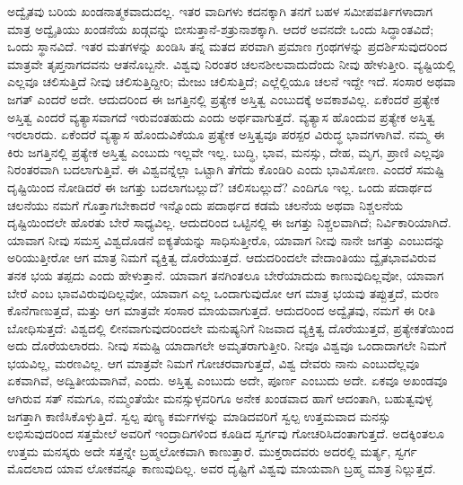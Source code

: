 ಅದ್ವೈತವು ಬರಿಯ ಖಂಡನಾತ್ಮಕವಾದುದಲ್ಲ. ಇತರ ವಾದಿಗಳು ಕದನಕ್ಕಾಗಿ ತನಗೆ ಬಹಳ ಸಮೀಪವರ್ತಿಗಳಾದಾಗ ಮಾತ್ರ ಅದ್ವೈತಿಯು ಖಂಡನೆಯ ಖಡ್ಗವನ್ನು ಬೀಸುತ್ತಾನೆ-ಶತ್ರುನಾಶಕ್ಕಾಗಿ. ಆದರೆ ಅವನದೇ ಒಂದು ಸಿದ್ಧಾಂತವಿದೆ; ಒಂದು ಸ್ಥಾನವಿದೆ. ಇತರ ಮತಗಳನ್ನು ಖಂಡಿಸಿ ತನ್ನ ಮತದ ಪರವಾಗಿ ಪ್ರಮಾಣ ಗ್ರಂಥಗಳನ್ನು ಪ್ರದರ್ಶಿಸುವುದರಿಂದ ಮಾತ್ರವೇ ತೃಪ್ತನಾಗದವನು ಆತನೊಬ್ಬನೇ. ವಿಶ್ವವು ನಿರಂತರ ಚಲನಶೀಲವಾದುದೆಂದು ನೀವು ಹೇಳುತ್ತೀರಿ. ವ್ಯಷ್ಟಿಯಲ್ಲಿ ಎಲ್ಲವೂ ಚಲಿಸುತ್ತಿದೆ ನೀವು ಚಲಿಸುತ್ತಿದ್ದೀರಿ; ಮೇಜು ಚಲಿಸುತ್ತಿದೆ; ಎಲ್ಲೆಲ್ಲಿಯೂ ಚಲನೆ ಇದ್ದೇ ಇದೆ. ಸಂಸಾರ ಅಥವಾ ಜಗತ್​ ಎಂದರೆ ಅದೇ. ಆದುದರಿಂದ ಈ ಜಗತ್ತಿನಲ್ಲಿ ಪ್ರತ್ಯೇಕ ಅಸ್ತಿತ್ವ  ಎಂಬುದಕ್ಕೆ ಅವಕಾಶವಿಲ್ಲ. ಏಕೆಂದರೆ ಪ್ರತ್ಯೇಕ ಅಸ್ತಿತ್ವ ಎಂದರೆ ವ್ಯತ್ಯಾಸವಾಗದೆ ಇರುವಂತಹುದು ಎಂದು ಅರ್ಥವಾಗುತ್ತದೆ. ವ್ಯತ್ಯಾಸ ಹೊಂದುವ ಪ್ರತ್ಯೇಕ ಅಸ್ತಿತ್ವ ಇರಲಾರದು. ಏಕೆಂದರೆ ವ್ಯತ್ಯಾಸ ಹೊಂದುವಿಕೆಯೂ ಪ್ರತ್ಯೇಕ ಅಸ್ತಿತ್ವವೂ ಪರಸ್ಪರ ವಿರುದ್ಧ ಭಾವಗಳಾಗಿವೆ. ನಮ್ಮ ಈ ಕಿರು ಜಗತ್ತಿನಲ್ಲಿ ಪ್ರತ್ಯೇಕ ಅಸ್ತಿತ್ವ ಎಂಬುದು ಇಲ್ಲವೇ ಇಲ್ಲ. ಬುದ್ಧಿ, ಭಾವ, ಮನಸ್ಸು, ದೇಹ, ಮೃಗ, ಪ್ರಾಣಿ ಎಲ್ಲವೂ ನಿರಂತರವಾಗಿ ಬದಲಾಗುತ್ತಿವೆ. ಈ ವಿಶ್ವವನ್ನೆಲ್ಲಾ ಒಟ್ಟಾಗಿ ತೆಗೆದು ಕೊಂಡಿರಿ ಎಂದು ಭಾವಿಸೋಣ. ಎಂದರೆ ಸಮಷ್ಟಿ ದೃಷ್ಟಿಯಿಂದ ನೋಡಿದರೆ ಈ ಜಗತ್ತು ಬದಲಾಗಬಲ್ಲುದೆ? ಚಲಿಸಬಲ್ಲುದೆ? ಎಂದಿಗೂ ಇಲ್ಲ. ಒಂದು ಪದಾರ್ಥದ ಚಲನೆಯು ನಮಗೆ ಗೊತ್ತಾಗಬೇಕಾದರೆ ಇನ್ನೊಂದು ಪದಾರ್ಥದ ಕಡಮೆ ಚಲನೆಯ ಅಥವಾ ನಿಶ್ಚಲನೆಯ ದೃಷ್ಟಿಯಿಂದಲೇ ಹೊರತು ಬೇರೆ ಸಾಧ್ಯವಿಲ್ಲ. ಆದುದರಿಂದ ಒಟ್ಟಿನಲ್ಲಿ ಈ ಜಗತ್ತು ನಿಶ್ಚಲವಾಗಿದೆ; ನಿರ್ವಿಕಾರಿಯಾಗಿದೆ. ಯಾವಾಗ ನೀವು ಸಮಸ್ತ ವಿಶ್ವದೊಡನೆ ಐಕ್ಯತೆಯನ್ನು ಸಾಧಿಸುತ್ತೀರೊ, ಯಾವಾಗ ನೀವು ನಾನೇ ಜಗತ್ತು ಎಂಬುದನ್ನು ಅರಿಯುತ್ತೀರೋ ಆಗ ಮಾತ್ರ ನಿಮಗೆ ವ್ಯಕ್ತಿತ್ವ ದೊರೆಯುತ್ತದೆ. ಆದುದರಿಂದಲೇ ವೇದಾಂತಿಯು ದ್ವೈತಭಾವವಿರುವ ತನಕ ಭಯ ತಪ್ಪದು ಎಂದು ಹೇಳುತ್ತಾನೆ. ಯಾವಾಗ ತನಗಿಂತಲೂ ಬೇರೆಯಾದುದು ಕಾಣುವುದಿಲ್ಲವೋ, ಯಾವಾಗ ಬೇರೆ ಎಂಬ ಭಾವವಿರುವುದಿಲ್ಲವೋ, ಯಾವಾಗ ಎಲ್ಲ ಒಂದಾಗುವುದೋ ಆಗ ಮಾತ್ರ ಭಯವು ತಪ್ಪುತ್ತದೆ, ಮರಣ ಕೊನೆಗಾಣುತ್ತದೆ, ಮತ್ತು ಆಗ ಮಾತ್ರವೇ ಸಂಸಾರ ಮಾಯವಾಗುತ್ತದೆ. ಆದುದರಿಂದ ಅದ್ವೈತವು, ನಮಗೆ ಈ ರೀತಿ ಬೋಧಿಸುತ್ತದೆ: ವಿಶ್ವದಲ್ಲಿ ಲೀನವಾಗುವುದರಿಂದಲೇ ಮನುಷ್ಯನಿಗೆ ನಿಜವಾದ ವ್ಯಕ್ತಿತ್ವ ದೊರೆಯುತ್ತದೆ, ಪ್ರತ್ಯೇಕತೆಯಿಂದ ಅದು ದೊರೆಯಲಾರದು. ನೀವು ಸಮಷ್ಟಿ ಯಾದಾಗಲೇ ಅಮೃತರಾಗುತ್ತೀರಿ. ನೀವೂ ವಿಶ್ವವೂ ಒಂದಾದಾಗಲೇ ನಿಮಗೆ ಭಯವಿಲ್ಲ, ಮರಣವಿಲ್ಲ. ಆಗ ಮಾತ್ರವೇ ನಿಮಗೆ ಗೋಚರವಾಗುತ್ತದೆ, ವಿಶ್ವ ದೇವರು ನಾನು ಎಂಬುದೆಲ್ಲವೂ ಏಕವಾಗಿವೆ, ಅದ್ವಿತೀಯವಾಗಿವೆ, ಎಂದು. ಅಸ್ತಿತ್ವ ಎಂಬುದು ಅದೇ, ಪೂರ್ಣ ಎಂಬುದು ಅದೇ. ಏಕವೂ ಅಖಂಡವೂ ಆಗಿರುವ ಸತ್​ ನಮಗೂ, ನಮ್ಮಂತೆಯೇ ಮನಸ್ಸುಳ್ಳವರಿಗೂ ಅನೇಕ ಖಂಡವಾದ ಹಾಗೆ ಆದಂತಾಗಿ, ಬಹುತ್ವವುಳ್ಳ ಜಗತ್ತಾಗಿ ಕಾಣಿಸಿಕೊಳ್ಳುತ್ತಿದೆ. ಸ್ವಲ್ಪ ಪುಣ್ಯ ಕರ್ಮಗಳನ್ನು ಮಾಡಿದವರಿಗೆ ಸ್ವಲ್ಪ ಉತ್ತಮವಾದ ಮನಸ್ಸು ಲಭಿಸುವುದರಿಂದ ಸತ್ತಮೇಲೆ ಅವರಿಗೆ ಇಂದ್ರಾದಿಗಳಿಂದ ಕೂಡಿದ ಸ್ವರ್ಗವು ಗೋಚರಿಸಿದಂತಾಗುತ್ತದೆ. ಅದಕ್ಕಿಂತಲೂ ಉತ್ತಮ ಮನಸ್ಕರು ಅದೇ ಸತ್ತನ್ನೇ ಬ್ರಹ್ಮಲೋಕವಾಗಿ ಕಾಣುತ್ತಾರೆ. ಮುಕ್ತರಾದವರು ಅದರಲ್ಲಿ ಮರ್ತ್ಯ, ಸ್ವರ್ಗ ಮೊದಲಾದ ಯಾವ ಲೋಕವನ್ನೂ ಕಾಣುವುದಿಲ್ಲ. ಅವರ ದೃಷ್ಟಿಗೆ ವಿಶ್ವವು ಮಾಯವಾಗಿ ಬ್ರಹ್ಮ ಮಾತ್ರ ನಿಲ್ಲುತ್ತದೆ.

